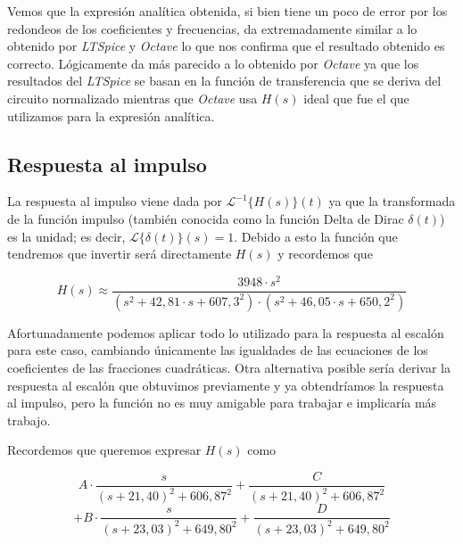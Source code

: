 \documentclass[11pt,a4paper]{report}
\begin{document}
Vemos que la expresión analítica obtenida, si bien tiene un poco de error por los redondeos de los coeficientes y frecuencias, da extremadamente similar a lo obtenido por \textit{LTSpice} y \textit{Octave} lo que nos confirma que el resultado obtenido es correcto. Lógicamente da más parecido a lo obtenido por \textit{Octave} ya que los resultados del \textit{LTSpice} se basan en la función de transferencia que se deriva del circuito normalizado mientras que \textit{Octave} usa $H(s)$ ideal que fue el que utilizamos para la expresión analítica.

\bigskip
\subsection*{Respuesta al impulso}
La respuesta al impulso viene dada por $\mathcal{L}^{-1}\{H(s)\}(t)$ ya que la transformada de la función impulso (también conocida como la función Delta de Dirac $\delta(t)$) es la unidad; es decir, $\mathcal{L}\{\delta(t)\}(s) = 1$. Debido a esto la función que tendremos que invertir será directamente $H(s)$ y recordemos que

\[H(s) \approx \frac{3948 \cdot s^2}{(s^2+42,81 \cdot s + 607,3^2)
\cdot (s^2+46,05 \cdot s + 650,2^2)}\]

Afortunadamente podemos aplicar todo lo utilizado para la respuesta al escalón para este caso, cambiando únicamente las igualdades de las ecuaciones de los coeficientes de las fracciones cuadráticas. Otra alternativa posible sería derivar la respuesta al escalón que obtuvimos previamente y ya obtendríamos la respuesta al impulso, pero la función no es muy amigable para trabajar e implicaría más trabajo.

\bigskip
Recordemos que queremos expresar $H(s)$ como

\[A \cdot \frac{s}{(s+21,40)^2 + 606,87^2} + \frac{C}{(s+21,40)^2 + 606,87^2}\] 
\[+ B \cdot \frac{s}{(s+23,03)^2 + 649,80^2} + \frac{D}{(s+23,03)^2 + 649,80^2}\]
\end{document}
